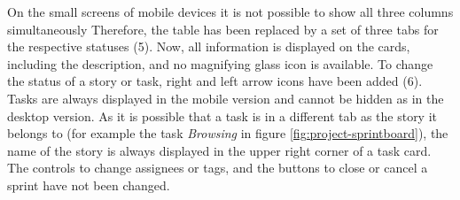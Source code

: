 \documentclass[
	accentcolor=tud1a %
]{tudreport}
\begin{document}
On the small screens of mobile devices it is not possible to show all three columns simultaneously Therefore, the table has been replaced by a set of three tabs for the respective statuses (5). Now, all information is displayed on the cards, including the description, and no magnifying glass icon is available. To change the status of a story or task, right and left arrow icons have been added (6). Tasks are always displayed in the mobile version and cannot be hidden as in the desktop version. As it is possible that a task is in a different tab as the story it belongs to (for example the task \emph{Browsing} in figure \ref{fig:project-sprintboard}), the name of the story is always displayed in the upper right corner of a task card. The controls to change assignees or tags, and the buttons to close or cancel a sprint have not been changed.
\end{document}
